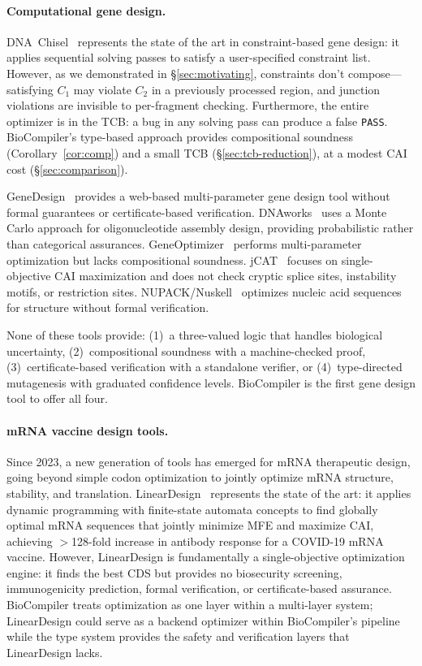 \documentclass[acmsmall,review,anonymous]{acmart}
\begin{document}
\paragraph{Computational gene design.}
DNA~Chisel~\cite{piret2020dnachisel} represents the state of the art in
constraint-based gene design: it applies sequential solving passes to
satisfy a user-specified constraint list.  However, as we demonstrated
in \S\ref{sec:motivating}, constraints don't compose---satisfying $C_1$
may violate $C_2$ in a previously processed region, and junction
violations are invisible to per-fragment checking.  Furthermore, the
entire optimizer is in the TCB: a bug in any solving pass can produce a
false \texttt{PASS}.  BioCompiler's type-based approach provides
compositional soundness (Corollary~\ref{cor:comp}) and a small TCB
(\S\ref{sec:tcb-reduction}), at a modest CAI cost (\S\ref{sec:comparison}).

GeneDesign~\cite{richardson2006genedesign} provides a web-based
multi-parameter gene design tool without formal guarantees or
certificate-based verification.  DNAworks~\cite{vandenbergh2015dnaworks}
uses a Monte Carlo approach for oligonucleotide assembly design,
providing probabilistic rather than categorical assurances.
GeneOptimizer~\cite{fath2011geneoptimizer} performs multi-parameter
optimization but lacks compositional soundness.
jCAT~\cite{gage2006jcat} focuses on single-objective CAI maximization
and does not check cryptic splice sites, instability motifs, or
restriction sites.  NUPACK/Nuskell~\cite{zadeh2011nupack} optimizes
nucleic acid sequences for structure without formal verification.

None of these tools provide: (1)~a three-valued logic that handles
biological uncertainty, (2)~compositional soundness with a machine-checked
proof, (3)~certificate-based verification with a standalone verifier, or
(4)~type-directed mutagenesis with graduated confidence levels.
BioCompiler is the first gene design tool to offer all four.

\paragraph{mRNA vaccine design tools.}
Since 2023, a new generation of tools has emerged for mRNA therapeutic
design, going beyond simple codon optimization to jointly optimize mRNA
structure, stability, and translation.  LinearDesign~\cite{zhang2023lineardesign}
represents the state of the art: it applies dynamic programming with
finite-state automata concepts to find globally optimal mRNA sequences
that jointly minimize MFE and maximize CAI, achieving $>$128-fold
increase in antibody response for a COVID-19 mRNA vaccine.  However,
LinearDesign is fundamentally a single-objective optimization engine:
it finds the best CDS but provides no biosecurity screening,
immunogenicity prediction, formal verification, or certificate-based
assurance.  BioCompiler treats optimization as one layer within a
multi-layer system; LinearDesign could serve as a backend optimizer
within BioCompiler's pipeline while the type system provides the safety
and verification layers that LinearDesign lacks.
\end{document}
